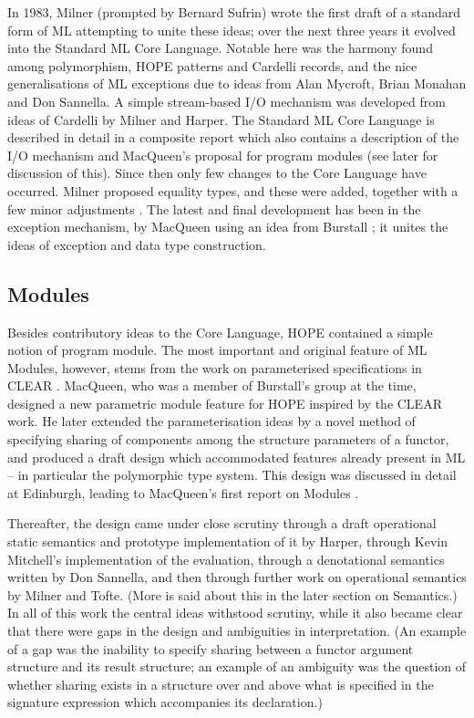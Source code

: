 In 1983, Milner (prompted by Bernard Sufrin) wrote the first draft of a
standard form of ML attempting to unite these ideas;  over the next three
years it evolved into the Standard ML Core Language.  Notable here was
the harmony found among polymorphism, HOPE patterns and Cardelli records,
and the nice generalisations of ML exceptions due to ideas from Alan
Mycroft, Brian Monahan and Don Sannella.  A simple stream-based I/O mechanism
was developed from ideas of Cardelli by Milner and Harper.  The Standard ML
Core Language is described in detail in a composite report \cite{HMM} which also
contains a description of the I/O mechanism and MacQueen's proposal
for program modules (see later for discussion of this). Since then only
few changes to the Core Language have occurred.  Milner proposed
equality types, and these were added, together with a few minor
adjustments \cite{Mil3}.   The latest and final development has been in the
exception mechanism, by MacQueen using an idea from Burstall \cite{AMMT};  
it unites the ideas of exception and data type construction.

\subsection*{Modules}

Besides contributory ideas to the Core Language, HOPE \cite{BMS} contained
a simple notion of program module.  The most important and original
feature of ML Modules, however, stems from the work on parameterised
specifications in CLEAR \cite{BG}.  MacQueen, who was a member of Burstall's
group at the time, designed \cite{Mac} a new parametric module feature for HOPE
inspired by the CLEAR work.
He later extended the parameterisation ideas by a novel method
of specifying sharing of components among the structure parameters of
a functor, and produced a draft design which accommodated features already
present in ML -- in particular the polymorphic type system.  This design
was discussed in detail at Edinburgh, leading to MacQueen's first
report on Modules \cite{HMM}.

Thereafter, the design came under close scrutiny through a draft operational
static semantics and prototype
implementation of it by Harper, through Kevin Mitchell's implementation of
the evaluation, through a denotational semantics written by
Don Sannella, and then through further work on operational semantics by Milner
and Tofte.  (More is said about this in the later section on Semantics.)
In all of this work the central ideas withstood scrutiny, while it
also became clear that there were gaps in the design and ambiguities in
interpretation.  (An example of a gap was the inability to specify sharing
between a functor argument structure and its result structure;  an
example of an ambiguity was the question of whether sharing exists in a
structure over and above what is specified in the signature expression
which accompanies its declaration.)

